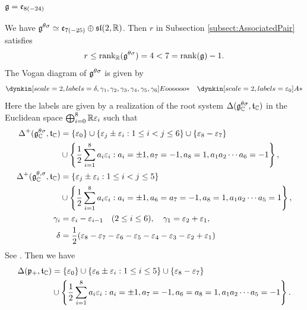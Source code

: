 \subsubsection{\texorpdfstring{$\mathfrak{g} = \mathfrak{e}_{8(-24)}$}{g=e8(-24)}}


We have $\mathfrak{g}^{\theta\sigma} \simeq \mathfrak{e}_{7(-25)} \oplus \mathfrak{sl}(2,\mathbb{R})$.
Then $r$ in Subsection \ref{subsect:AssociatedPair} satisfies
\begin{align*}
	r \leq \operatorname{rank}_{\mathbb{R}}(\mathfrak{g}^{\theta\sigma}) = 4 < 7 = \operatorname{rank}(\mathfrak{g}) - 1.
\end{align*}
The Vogan diagram of $\mathfrak{g}^{\theta\sigma}$ is given by
\begin{align*}
	\dynkin[scale=2, labels={\delta, \gamma_1, \gamma_2, \gamma_3, \gamma_4, \gamma_5, \gamma_6}]{E}{oooooo*}
	\quad \dynkin[scale=2, labels={\varepsilon_0}]{A}{*}
\end{align*}
Here the labels are given by a realization of the root system $\Delta(\mathfrak{g}_{\mathbb{C}}^{\theta\sigma}, \mathfrak{t}_{\mathbb{C}})$ in the Euclidean space $\bigoplus_{i=0}^8 \mathbb{R} \varepsilon_i$ such that
\begin{align*}
	\Delta^+(\mathfrak{g}_{\mathbb{C}}^{\theta\sigma}, \mathfrak{t}_{\mathbb{C}}) &= \left\{\varepsilon_0 \right\} \cup \left\{\varepsilon_j \pm \varepsilon_i: 1\leq i < j \leq 6 \right\} \cup \left\{\varepsilon_8 - \varepsilon_7 \right\}\\
	&\cup \left\{\frac{1}{2}\sum_{i=1}^8 a_i \varepsilon_i: a_i = \pm 1, a_7=-1, a_8=1, a_1a_2\cdots a_6 = -1 \right\}, \\
	\Delta^+(\mathfrak{g}_{\mathbb{C}}^{\theta, \sigma}, \mathfrak{t}_{\mathbb{C}}) &= \left\{\varepsilon_j \pm \varepsilon_i: 1\leq i < j \leq 5 \right\} \\
	& \cup \left\{\frac{1}{2}\sum_{i=1}^8 a_i \varepsilon_i: a_i = \pm 1, a_6=a_7=-1,a_8=1,a_1a_2\cdots a_5 = 1 \right\},\\
	\gamma_i &= \varepsilon_i - \varepsilon_{i - 1} \quad (2\leq i \leq 6), \quad \gamma_1 = \varepsilon_2 + \varepsilon_1, \\
	\delta &= \frac{1}{2}(\varepsilon_8 - \varepsilon_7 - \varepsilon_6 - \varepsilon_5 - \varepsilon_4 - \varepsilon_3 - \varepsilon_2 + \varepsilon_1)
\end{align*}
See \cite[Chapter VI, \S 4.11]{Bo02}.
Then we have
\begin{align*}
	\Delta(\mathfrak{p}_+, \mathfrak{t}_{\mathbb{C}}) &= \left\{\varepsilon_0 \right\} \cup \left\{\varepsilon_6 \pm \varepsilon_i: 1\leq i \leq 5 \right\} \cup \left\{\varepsilon_8 - \varepsilon_7 \right\} \\
	&\cup \left\{\frac{1}{2}\sum_{i=1}^8 a_i \varepsilon_i: a_i = \pm 1, a_7=-1,a_6=a_8=1,a_1a_2\cdots a_5 = -1 \right\}.
\end{align*}

